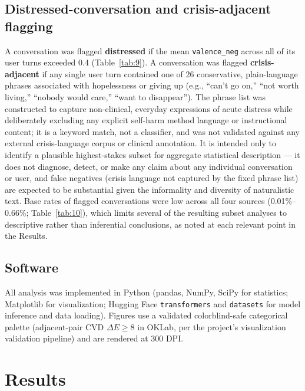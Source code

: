 \documentclass[11pt]{article}
\begin{document}
\subsection{Distressed-conversation and crisis-adjacent flagging}

A conversation was flagged \textbf{distressed} if the mean \texttt{valence\_neg} across all of its user turns exceeded 0.4 (Table~\ref{tab:9}). A conversation was flagged \textbf{crisis-adjacent} if any single user turn contained one of 26 conservative, plain-language phrases associated with hopelessness or giving up (e.g., ``can't go on,'' ``not worth living,'' ``nobody would care,'' ``want to disappear''). The phrase list was constructed to capture non-clinical, everyday expressions of acute distress while deliberately excluding any explicit self-harm method language or instructional content; it is a keyword match, not a classifier, and was not validated against any external crisis-language corpus or clinical annotation. It is intended only to identify a plausible highest-stakes subset for aggregate statistical description --- it does not diagnose, detect, or make any claim about any individual conversation or user, and false negatives (crisis language not captured by the fixed phrase list) are expected to be substantial given the informality and diversity of naturalistic text. Base rates of flagged conversations were low across all four sources (0.01\%--0.66\%; Table~\ref{tab:10}), which limits several of the resulting subset analyses to descriptive rather than inferential conclusions, as noted at each relevant point in the Results.

\subsection{Software}

All analysis was implemented in Python (pandas, NumPy, SciPy for statistics; Matplotlib for visualization; Hugging Face \texttt{transformers} and \texttt{datasets} for model inference and data loading). Figures use a validated colorblind-safe categorical palette (adjacent-pair CVD $\Delta E \geq 8$ in OKLab, per the project's visualization validation pipeline) and are rendered at 300 DPI.

\section{Results}
\end{document}
